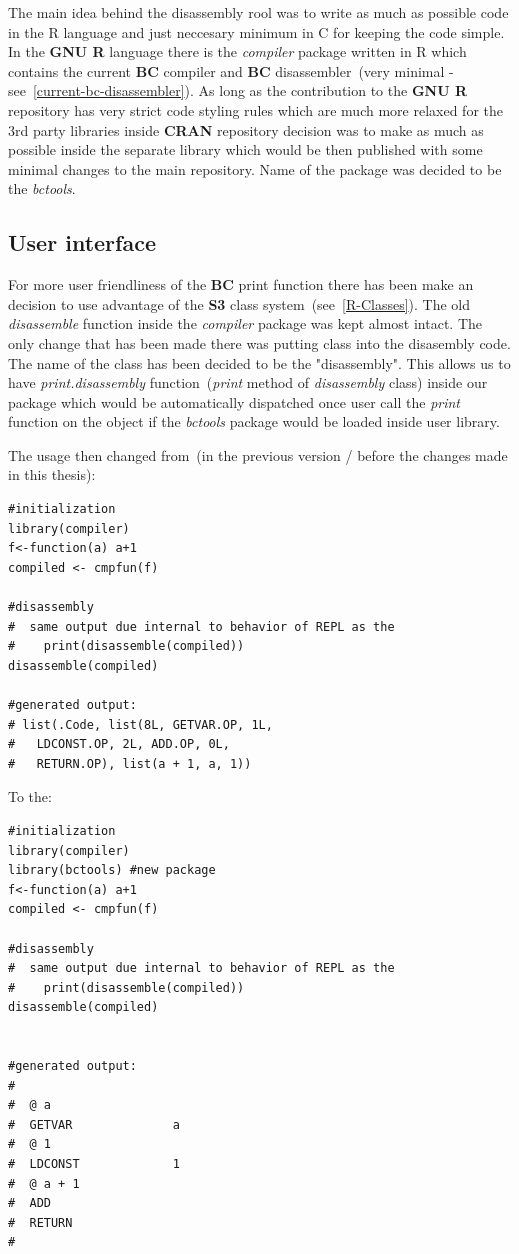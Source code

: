 \documentclass[thesis=M,english]{FITthesis}[2018/10/20]
\begin{document}
The main idea behind the disassembly rool was to write as much as possible code in the R language and just neccesary minimum in C for keeping the code simple. In the \textbf{GNU R} language there is the \textit{compiler} package written in R which contains the current \textbf{BC} compiler and \textbf{BC} disassembler~(very minimal - see~\ref{current-bc-disassembler}). As long as the contribution to the \textbf{GNU R} repository has very strict code styling rules which are much more relaxed for the 3rd party libraries inside \textbf{CRAN} repository decision was to make as much as possible inside the separate library which would be then published with some minimal changes to the main repository. Name of the package was decided to be the \textit{bctools}.

\subsection{User interface}

For more user friendliness of the \textbf{BC} print function there has been make an decision to use advantage of the \textbf{S3} class system~(see~\ref{R-Classes}). The old \textit{disassemble} function inside the \textit{compiler} package was kept almost intact. The only change that has been made there was putting class into the disasembly code. The name of the class has been decided to be the "disassembly". This allows us to have \textit{print.disassembly} function~(\textit{print} method of \textit{disassembly} class) inside our package which would be automatically dispatched once user call the \textit{print} function on the object if the \textit{bctools} package would be loaded inside user library.

The usage then changed from~(in the previous version / before the changes made in this thesis):

\begin{lstlisting}
#initialization
library(compiler)
f<-function(a) a+1
compiled <- cmpfun(f)

#disassembly
#  same output due internal to behavior of REPL as the
#    print(disassemble(compiled))
disassemble(compiled)

#generated output:
# list(.Code, list(8L, GETVAR.OP, 1L,
#   LDCONST.OP, 2L, ADD.OP, 0L,
#   RETURN.OP), list(a + 1, a, 1))
\end{lstlisting}


To the:

\begin{lstlisting}
#initialization
library(compiler)
library(bctools) #new package
f<-function(a) a+1
compiled <- cmpfun(f)

#disassembly
#  same output due internal to behavior of REPL as the
#    print(disassemble(compiled))
disassemble(compiled)


#generated output:
#
#  @ a
#  GETVAR              a
#  @ 1
#  LDCONST             1
#  @ a + 1
#  ADD
#  RETURN
#
\end{lstlisting}
\end{document}
